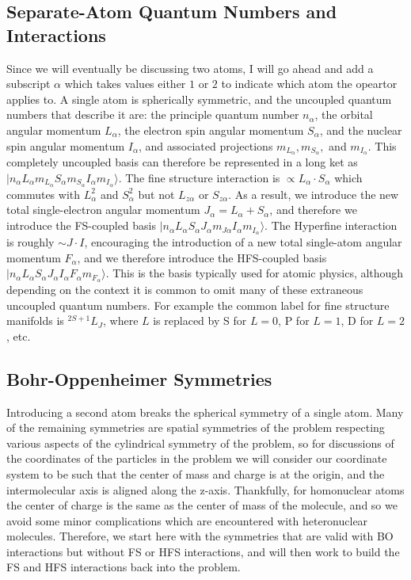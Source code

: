 \documentclass[prl, longbibliography]{revtex4-2}
\begin{document}
\subsection{Separate-Atom Quantum Numbers and Interactions}
Since we will eventually be discussing two atoms, I will go ahead and add a subscript $\alpha$ which takes values either $1$ or $2$ to indicate which atom the opeartor applies to.
A single atom is spherically symmetric, and the uncoupled quantum numbers that describe it are: the principle quantum number $n_\alpha$, the orbital angular momentum $L_\alpha$, the electron spin angular momentum $S_\alpha$, and the nuclear spin angular momentum $I_\alpha$, and associated projections $m_{L_\alpha}, m_{S_\alpha}, $ and $m_{I_\alpha}$. 
This completely uncoupled basis can therefore be represented in a long ket as $|n_\alpha L_\alpha m_{L_\alpha} S_\alpha m_{S_\alpha} I_\alpha m_{I_\alpha}\rangle$.
The fine structure interaction is $\propto L_\alpha\cdot S_\alpha$ which commutes with $L^2_\alpha$ and $S^2_\alpha$ but not $L_{z\alpha}$ or $S_{z\alpha}$.
As a result, we introduce the new total single-electron angular momentum $J_\alpha=L_\alpha+S_\alpha$, and therefore we introduce the FS-coupled basis $|n_\alpha L_\alpha S_\alpha J_\alpha m_{J\alpha} I_\alpha m_{I_\alpha}\rangle$.
The Hyperfine interaction is roughly $\sim J\cdot I$, encouraging the introduction of a new total single-atom angular momentum $F_\alpha$, and we therefore introduce the HFS-coupled basis $|n_\alpha L_\alpha S_\alpha J_\alpha I_\alpha F_\alpha m_{F_\alpha}\rangle$. 
This is the basis typically used for atomic physics, although depending on the context it is common to omit many of these extraneous uncoupled quantum numbers. 
For example the common label for fine structure manifolds is $^{2S+1}L_J$, where $L$ is replaced by S for $L=0$, P for $L=1$, D for $L=2$, etc.

\subsection{Bohr-Oppenheimer Symmetries}
Introducing a second atom breaks the spherical symmetry of a single atom.
Many of the remaining symmetries are spatial symmetries of the problem respecting various aspects of the cylindrical symmetry of the problem, so for discussions of the coordinates of the particles in the problem we will consider our coordinate system to be such that the center of mass and charge is at the origin, and the intermolecular axis is aligned along the z-axis. 
Thankfully, for homonuclear atoms the center of charge is the same as the center of mass of the molecule, and so we avoid some minor complications which are encountered with heteronuclear molecules.
Therefore, we start here with the symmetries that are valid with BO interactions but without FS or HFS interactions, and will then work to build the FS and HFS interactions back into the problem.
\end{document}
